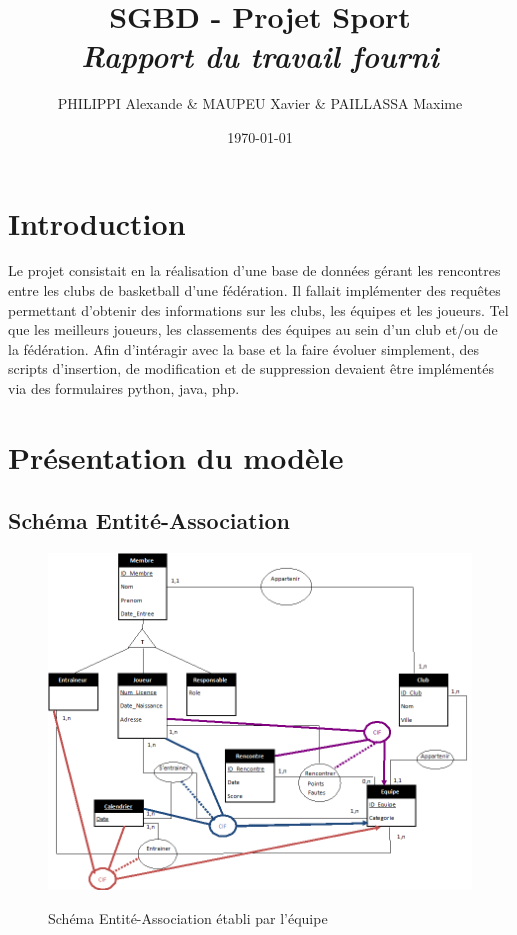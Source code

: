 \documentclass[a4paper»,8pt,french,fleqn]{report}
\title{\textbf{SGBD - Projet Sport }\\\textit{Rapport du travail fourni}}
\author{PHILIPPI Alexande \& MAUPEU Xavier \& PAILLASSA Maxime}
\date{\today}
\begin{document}
\maketitle

\newpage

\tableofcontents

\newpage

\chapter*{Introduction}

Le projet consistait en la réalisation d'une base de données gérant les rencontres entre les clubs de basketball d'une fédération. Il fallait implémenter des requêtes permettant d'obtenir des informations sur les clubs, les équipes et les joueurs. Tel que les meilleurs joueurs, les classements des équipes au sein d'un club et/ou de la fédération. Afin d'intéragir avec la base et la faire évoluer simplement, des scripts d'insertion, de modification et de suppression devaient être implémentés via des formulaires python, java, php.

\chapter{Présentation du modèle}

\section{Schéma Entité-Association}

\begin{figure}[h]
  \centering
    \includegraphics[scale=0.7]{Schema_EA.png}
    \label{fig:schema_ea}
    \caption{Schéma Entité-Association établi par l'équipe}
\end{figure}
\end{document}
